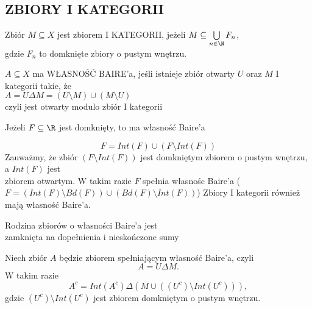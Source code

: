 \subsection{ZBIORY I KATEGORII}
\begin{center}\large
    Zbiór $M\subseteq X$ jest zbiorem {\color{def}I KATEGORII}, jeżeli $M\subseteq \bigcup\limits_{n\in\N}F_n$, \\gdzie $F_n$ to domknięte zbiory o pustym wnętrzu.
\end{center}\bigskip
\begin{center}\large
    $A\subseteq X$ ma {\color{def}WŁASNOŚĆ BAIRE'a}, jeśli istnieje zbiór otwarty $U$ oraz $M$ I kategorii takie, że\smallskip\\
    $A=U\Delta M=(U\setminus M)\cup(M\setminus U)$\medskip\\
    czyli jest otwarty modulo zbiór I kategorii
\end{center}\bigskip
{}\bigskip
\begin{center}\large
    Jeżeli $F\subseteq \R$ jest domknięty, to ma własność Baire'a
\end{center}
\dowod
$$F=Int(F)\cup(F\setminus Int(F))$$
Zauważmy, że zbiór $(F\setminus Int(F))$ jest domkniętym zbiorem o pustym wnętrzu, a $Int(F)$ jest \\zbiorem otwartym. W takim razie $F$ spełnia własnośc Baire'a ($F=(Int(F)\setminus Bd(F))\cup(Bd(F)\setminus Int(F))$)
\kondow
Zbiory I kategorii również mają własność Baire'a.\bigskip\\
\begin{center}\large
    Rodzina zbiorów o własności Baire'a jest \\zamknięta na dopełnienia i nieskończone sumy
\end{center}
\dowod
Niech zbiór $A$ będzie zbiorem spełniającym własność Baire'a, czyli
$$A=U\Delta M.$$
W takim razie
$$A^c=Int(A^c)\Delta (M\cup((U^c)\setminus Int(U^c))),$$
gdzie $(U^c)\setminus Int(U^c)$ jest zbiorem domkniętym o pustym wnętrzu. 